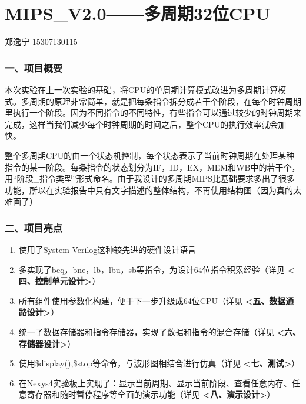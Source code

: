 \documentclass[]{article}
\date{}
\begin{document}
\section{MIPS\_V2.0------多周期32位CPU}\label{header-n1821}

郑逸宁 15307130115

\tableofcontents

\subsubsection{一、项目概要}\label{header-n1826}

本次实验在上一次实验的基础，将CPU的单周期计算模式改进为多周期计算模式。多周期的原理非常简单，就是把每条指令拆分成若干个阶段，在每个时钟周期里执行一个阶段。因为不同指令的不同特性，有些指令可以通过较少的时钟周期来完成，这样当我们减少每个时钟周期的时间之后，整个CPU的执行效率就会加快。

整个多周期CPU的由一个状态机控制，每个状态表示了当前时钟周期在处理某种指令的某一阶段。每条指令的状态划分为IF，ID，EX，MEM和WB中的若干个，用``阶段\_指令类型''形式命名。由于我设计的多周期MIPS比基础要求多出了很多功能，所以在实验报告中只有文字描述的整体结构，不再使用结构图（因为真的太难画了）

\subsubsection{二、项目亮点}\label{header-n1831}

\begin{enumerate}
\def\labelenumi{\arabic{enumi}.}
\item
  使用了System Verilog这种较先进的硬件设计语言
\item
  多实现了beq，bne，lb，lbu，sb等指令，为设计64位指令积累经验（详见
  \textbf{\textless{}四、控制单元设计\textgreater{}}）
\item
  所有组件使用参数化构建，便于下一步升级成64位CPU（详见
  \textbf{\textless{}五、数据通路设计\textgreater{}}）
\item
  统一了数据存储器和指令存储器，实现了数据和指令的混合存储（详见
  \textbf{\textless{}六、存储器设计\textgreater{}}）
\item
  使用\$display(),\$stop等命令，与波形图相结合进行仿真（详见
  \textbf{\textless{}七、测试\textgreater{}}）
\item
  在Nexys4实验板上实现了：显示当前周期、显示当前阶段、查看任意内存、任意寄存器和随时暂停程序等全面的演示功能（详见
  \textbf{\textless{}八、演示设计\textgreater{}}）
\end{enumerate}
\end{document}
